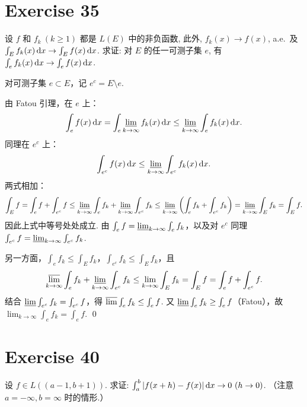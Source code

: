 \documentclass{article}
\begin{document}
\section{Exercise 35}

设 $f$ 和 $f_k\ (k \ge 1)$ 都是 $L(E)$ 中的非负函数, 此外, $f_k(x) \to f(x)$, a.e.\ 及 $\int_E f_k(x)\,\mathrm{d} x \to \int_E f(x)\,\mathrm{d} x$. 求证: 对 $E$ 的任一可测子集 $e$, 有 $\int_e f_k(x)\,\mathrm{d} x \to \int_e f(x)\,\mathrm{d} x$.

\begin{solution}
  对可测子集 $e \subset E$，记 $e^c = E \setminus e$.

  由 Fatou 引理，在 $e$ 上：
  \[
    \int_e f(x)\,\mathrm{d} x = \int_e \varliminf_{k\to\infty} f_k(x)\,\mathrm{d} x
    \le \varliminf_{k\to\infty} \int_e f_k(x)\,\mathrm{d} x.
  \]
  同理在 $e^c$ 上：
  \[
    \int_{e^c} f(x)\,\mathrm{d} x \le \varliminf_{k\to\infty} \int_{e^c} f_k(x)\,\mathrm{d} x.
  \]
  两式相加：
  \[
    \int_E f = \int_e f + \int_{e^c} f
    \le \varliminf_{k\to\infty} \int_e f_k + \varliminf_{k\to\infty} \int_{e^c} f_k
    \le \varliminf_{k\to\infty} \left(\int_e f_k + \int_{e^c} f_k\right)
    = \varliminf_{k\to\infty} \int_E f_k = \int_E f.
  \]
  因此上式中等号处处成立. 由 $\int_e f = \varliminf_{k\to\infty} \int_e f_k$，以及对 $e^c$ 同理
  $\int_{e^c} f = \varliminf_{k\to\infty} \int_{e^c} f_k$.

  另一方面，$\int_e f_k \le \int_E f_k$，$\int_{e^c} f_k \le \int_E f_k$，且
  \[
    \varlimsup_{k\to\infty} \int_e f_k + \varliminf_{k\to\infty} \int_{e^c} f_k
    \le \lim_{k\to\infty} \int_E f_k = \int_E f = \int_e f + \int_{e^c} f.
  \]
  结合 $\varliminf \int_{e^c} f_k = \int_{e^c} f$，得 $\varlimsup \int_e f_k \le \int_e f$.
  又 $\varliminf \int_e f_k \ge \int_e f$（Fatou），故 $\lim_{k\to\infty} \int_e f_k = \int_e f$. \qed
\end{solution}

\section{Exercise 40}

设 $f \in L((a-1, b+1))$. 求证: $\int_a^b |f(x+h) - f(x)|\,\dif x \to 0\ (h \to 0)$.
（注意 $a = -\infty, b = \infty$ 时的情形.）
\end{document}
